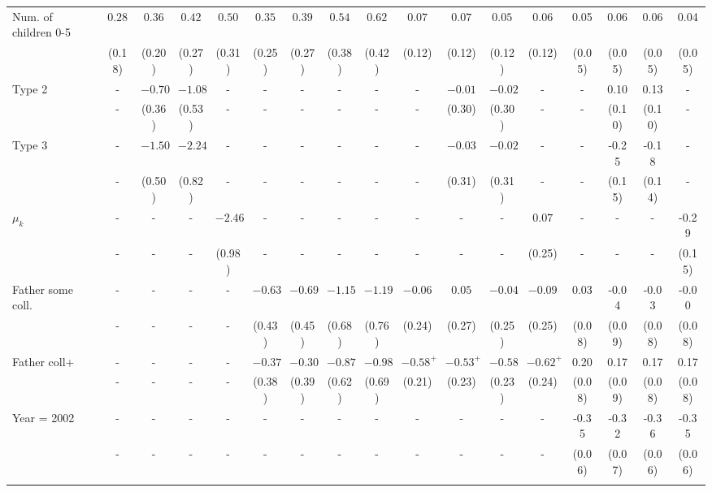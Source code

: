 \begin{tabular}{lcccccccccccccccc}
Num. of children 0-5&$0.28$&$0.36$&$0.42$&$0.50$&$0.35$&$0.39$&$0.54$&$0.62$&$0.07$&$0.07$&$0.05$&$0.06$&0.05&0.06&0.06&0.04\\
&(0.18)&(0.20)&(0.27)&(0.31)&(0.25)&(0.27)&(0.38)&(0.42)&(0.12)&(0.12)&(0.12)&(0.12)&(0.05)&(0.05)&(0.05)&(0.05)\\
Type 2&-&$-0.70$&$-1.08$&-&-&-&-&-&-&$-0.01$&$-0.02$&-&-&0.10&0.13&-\\
&-&(0.36)&(0.53)&-&-&-&-&-&-&(0.30)&(0.30)&-&-&(0.10)&(0.10)&-\\
Type 3&-&$-1.50$&$-2.24$&-&-&-&-&-&-&$-0.03$&$-0.02$&-&-&-0.25&-0.18&-\\
&-&(0.50)&(0.82)&-&-&-&-&-&-&(0.31)&(0.31)&-&-&(0.15)&(0.14)&-\\
$\mu_{k}$&-&-&-&$-2.46$&-&-&-&-&-&-&-&$0.07$&-&-&-&-0.29\\
&-&-&-&(0.98)&-&-&-&-&-&-&-&(0.25)&-&-&-&(0.15)\\
Father some coll.&-&-&-&-&$-0.63$&$-0.69$&$-1.15$&$-1.19$&$-0.06$&$0.05$&$-0.04$&$-0.09$&0.03&-0.04&-0.03&-0.00\\
&-&-&-&-&(0.43)&(0.45)&(0.68)&(0.76)&(0.24)&(0.27)&(0.25)&(0.25)&(0.08)&(0.09)&(0.08)&(0.08)\\
Father coll+&-&-&-&-&$-0.37$&$-0.30$&$-0.87$&$-0.98$&$-0.58^{+}$&$-0.53^{+}$&$-0.58$&$-0.62^{+}$&0.20&0.17&0.17&0.17\\
&-&-&-&-&(0.38)&(0.39)&(0.62)&(0.69)&(0.21)&(0.23)&(0.23)&(0.24)&(0.08)&(0.09)&(0.08)&(0.08)\\
Year = 2002&-&-&-&-&-&-&-&-&-&-&-&-&-0.35&-0.32&-0.36&-0.35\\
&-&-&-&-&-&-&-&-&-&-&-&-&(0.06)&(0.07)&(0.06)&(0.06)\\
\\
\bottomrule\end{tabular}